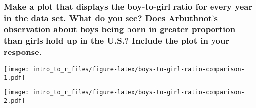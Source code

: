 \documentclass[
]{article}
\newenvironment{Shaded}{\begin{snugshade}}{\end{snugshade}}
\newcommand{\DataTypeTok}[1]{\textcolor[rgb]{0.13,0.29,0.53}{#1}}
\newcommand{\KeywordTok}[1]{\textcolor[rgb]{0.13,0.29,0.53}{\textbf{#1}}}
\newcommand{\NormalTok}[1]{#1}
\newcommand{\OperatorTok}[1]{\textcolor[rgb]{0.81,0.36,0.00}{\textbf{#1}}}
\newcommand{\StringTok}[1]{\textcolor[rgb]{0.31,0.60,0.02}{#1}}
\begin{document}
\hypertarget{make-a-plot-that-displays-the-boy-to-girl-ratio-for-every-year-in-the-data-set.-what-do-you-see-does-arbuthnots-observation-about-boys-being-born-in-greater-proportion-than-girls-hold-up-in-the-u.s.-include-the-plot-in-your-response.}{%
\subsubsection{\texorpdfstring{\textbf{Make a plot that displays the
boy-to-girl ratio for every year in the data set. What do you see? Does
Arbuthnot's observation about boys being born in greater proportion than
girls hold up in the U.S.? Include the plot in your
response.}}{Make a plot that displays the boy-to-girl ratio for every year in the data set. What do you see? Does Arbuthnot's observation about boys being born in greater proportion than girls hold up in the U.S.? Include the plot in your response.}}\label{make-a-plot-that-displays-the-boy-to-girl-ratio-for-every-year-in-the-data-set.-what-do-you-see-does-arbuthnots-observation-about-boys-being-born-in-greater-proportion-than-girls-hold-up-in-the-u.s.-include-the-plot-in-your-response.}}

\begin{Shaded}
\end{Shaded}

\texttt{[image: intro\_to\_r\_files/figure-latex/boys-to-girl-ratio-comparison-1.pdf]}

\begin{Shaded}
\end{Shaded}

\texttt{[image: intro\_to\_r\_files/figure-latex/boys-to-girl-ratio-comparison-2.pdf]}
\end{document}
